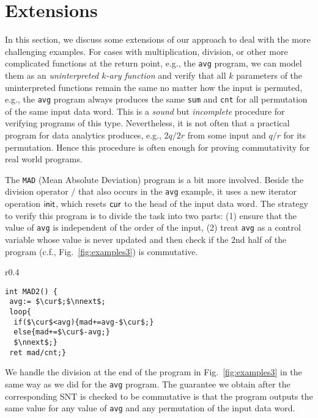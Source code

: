 

\section{Extensions}
\label{sec:cases}



In this section, we discuss some extensions of our approach to deal with the more challenging examples. 
For cases with multiplication, division, or other more complicated functions at the return point, e.g., the \texttt{avg} program, we can model them as an \emph{uninterpreted $k$-ary function} and verify that all $k$ parameters of the uninterpreted functions remain the same no matter how the input is permuted, e.g., the \texttt{avg} program always produces the same \texttt{sum} and \texttt{cnt} for all permutation of the same input data word. This is a \emph{sound} but \emph{incomplete} procedure for verifying programs of this type. Nevertheless, it is not often that a  practical program for data analytics produces, e.g., $2q/2r$ from some input and $q/r$ for its permutation. Hence this procedure is often enough for proving commutativity for real world programs.

The \texttt{MAD} (Mean Absolute Deviation) program is a bit more involved. Beside the division operator $/$ that also occurs in the \texttt{avg} example, it uses a new iterator operation $\mathsf{init}$, which resets $\mathsf{cur}$ to the head of the input data word. The strategy to verify this program is to divide the task into two parts: (1) ensure that the value of \texttt{avg} is independent of the order of the input, (2) treat \texttt{avg} as a control variable whose value is never updated and then check if the 2nd half of the program (c.f., Fig.~\ref{fig:examples3}) is commutative. 

\begin{wrapfigure}{r}{0.4\textwidth}
	\vspace{-0.8cm}
	\lstset{language=C,
		basicstyle=\ttfamily\scriptsize}
	\begin{lstlisting}[mathescape=true]
int MAD2() {
 avg:= $\cur$;$\nnext$;
 loop{
  if($\cur$<avg){mad+=avg-$\cur$;}
  else{mad+=$\cur$-avg;}
  $\nnext$;}
 ret mad/cnt;}
	\end{lstlisting}	
	\vspace{-0.4cm}
	\caption{The 2nd half of MAD}
	\label{fig:examples3}
	\vspace{-0.7cm}
\end{wrapfigure}
We handle the division at the end of the program in Fig.~\ref{fig:examples3} in the same way as we did for the \texttt{avg} program. The guarantee we obtain after the corresponding SNT is checked to be commutative is that the program outputs the same value for any value of \texttt{avg} and any permutation of  the input data word. 


